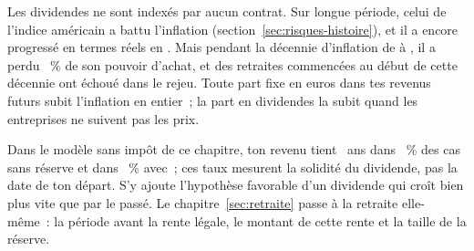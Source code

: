 Les dividendes ne sont index\'es par aucun contrat. Sur longue p\'eriode, celui de l'indice am\'ericain a
battu l'inflation (section~\ref{sec:risques-histoire}), et il a encore progress\'e en termes r\'eels en
\ShillerFin. Mais pendant la d\'ecennie d'inflation de \EinbruchInflationDebut{} \`a
\EinbruchInflationFin, il a perdu \EinbruchInflation~\% de son pouvoir d'achat, et des retraites
commenc\'ees au d\'ebut de cette d\'ecennie ont \'echou\'e dans le rejeu. Toute part fixe en euros dans
tes revenus futurs subit l'inflation en entier~; la part en dividendes la subit quand les entreprises
ne suivent pas les prix.

 Dans le mod\`ele sans imp\^ot de
ce chapitre, ton revenu tient \McRenteAns~ans dans \ErfolgsquoteBasis~\% des cas sans r\'eserve et dans
\ErfolgsquoteMitPuffer~\% avec~; ces taux mesurent la solidit\'e du dividende, pas la date de ton
d\'epart. S'y ajoute l'hypoth\`ese favorable d'un dividende qui cro\^it bien plus vite que par le
pass\'e. Le chapitre~\ref{sec:retraite} passe \`a la retraite elle-m\^eme~: la p\'eriode avant la rente l\'egale, le
montant de cette rente et la taille de la r\'eserve.

